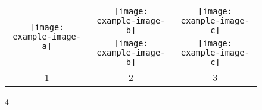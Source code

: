 
\begin{figure}[htbp]
    \centering
    \begin{tabular}{ccc} %

        \multirow{2}{*}{\texttt{[image: example-image-a]}} & 
        \texttt{[image: example-image-b]} & 
        \texttt{[image: example-image-c]} \\

        & 
        \texttt{[image: example-image-b]} & 
        \texttt{[image: example-image-c]} \\

        1 & 
        2 & 
        3\\

    \end{tabular}
    \caption{4}
    \label{fig:total}
\end{figure}